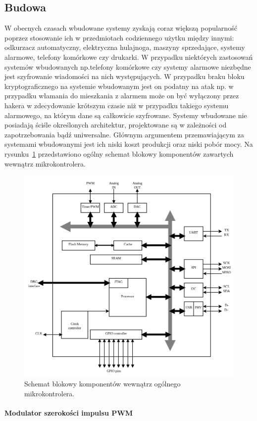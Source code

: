 \documentclass[12p]{article}
\begin{document}
\subsection{Budowa }
\quad W obecnych czasach wbudowane systemy zyskają coraz większą popularność poprzez stosowanie ich w przedmiotach codziennego użytku między innymi: odkurzacz automatyczny, elektryczna hulajnoga, maszyny sprzedające, systemy alarmowe, telefony komórkowe czy drukarki. W przypadku niektórych zastosowań systemów wbudowanych np.telefony komórkowe czy systemy alarmowe niezbędne jest szyfrowanie wiadomości na nich występujących. W przypadku braku bloku kryptograficznego na systemie wbudowanym jest on podatny na atak np. w przypadku włamania do mieszkania z alarmem może on być wyłączony przez hakera w zdecydowanie krótszym czasie niż w przypadku takiego systemu alarmowego, na którym dane są całkowicie szyfrowane. Systemy wbudowane nie posiadają ściśle określonych architektur, projektowane są w zależności od zapotrzebowania bądź uniwersalne. Głównym argumentem przemawiającym za systemami wbudowanymi jest ich niski koszt produkcji oraz niski pobór mocy. Na rysunku~\ref{es} przedstawiono ogólny schemat blokowy komponentów zawartych wewnątrz mikrokontrolera.
\begin{figure}[H]
\centering
\includegraphics[width=12cm]{es.png}
\caption{Schemat blokowy komponentów wewnątrz ogólnego mikrokontrolera.~\cite{es}}\label{es}
\end{figure}

\paragraph{Modulator szerokości impulsu PWM} \mbox{} \\
\end{document}
